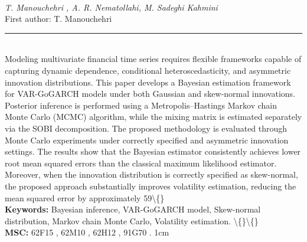 \documentclass[10pt,twoside]{article}
\begin{document}
\noindent\begin{minipage}[t][\textheight]{\textwidth}
\\[0.35em]
{\itshape T. Manouchehri , A. R. Nematollahi, M. Sadeghi Kahmini}\\[0.2em]
{\footnotesize First author: T. Manouchehri}\\[0.45em]
\noindent\rule{\textwidth}{0.3pt}\\[0.4em]
{\footnotesize  Modeling multivariate financial time series requires flexible frameworks capable of capturing dynamic dependence, conditional heteroscedasticity, and asymmetric innovation distributions. This paper develops a Bayesian estimation framework for VAR-GoGARCH models under both Gaussian and skew-normal innovations. Posterior inference is performed using a Metropolis--Hastings Markov chain Monte Carlo (MCMC) algorithm, while the mixing matrix is estimated separately via the SOBI decomposition. The proposed methodology is evaluated through Monte Carlo experiments under correctly specified and asymmetric innovation settings. The results show that the Bayesian estimator consistently achieves lower root mean squared errors than the classical maximum likelihood estimator. Moreover, when the innovation distribution is correctly specified as skew-normal, the proposed approach substantially improves volatility estimation, reducing the mean squared error by approximately 59\textbackslash\{\}}\\[0.4em]
{\footnotesize\bfseries Keywords:} {\footnotesize Bayesian inference, VAR-GoGARCH model, Skew-normal distribution, Markov chain Monte Carlo, Volatility estimation. \textbackslash\{\}\textbackslash\{\}}\\[0.15em]
{\footnotesize\bfseries MSC:} {\footnotesize 62F15 , 62M10 , 62H12 , 91G70 . 1cm}\\
\vfill
\end{minipage}
\newpage
\end{document}
